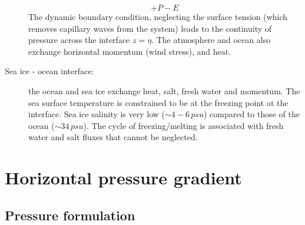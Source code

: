 \documentclass[../main/NEMO_manual]{subfiles}
\begin{document}
\begin{description}
\[    + P-E
  \]
  The dynamic boundary condition, neglecting the surface tension (which removes capillary waves from the system)
  leads to the continuity of pressure across the interface $z=\eta$.
  The atmosphere and ocean also exchange horizontal momentum (wind stress), and heat.
\item[Sea ice - ocean interface:]
  the ocean and sea ice exchange heat, salt, fresh water and momentum.
  The sea surface temperature is constrained to be at the freezing point at the interface.
  Sea ice salinity is very low ($\sim4-6 \,psu$) compared to those of the ocean ($\sim34 \,psu$).
  The cycle of freezing/melting is associated with fresh water and salt fluxes that cannot be neglected.
\end{description}



\section{Horizontal pressure gradient }
\label{sec:PE_hor_pg}

\subsection{Pressure formulation}
\label{subsec:PE_p_formulation}
\end{document}
